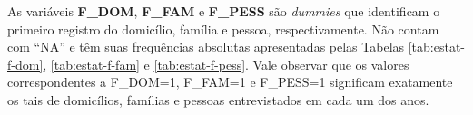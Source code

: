 As variáveis \textbf{F_DOM}, \textbf{F_FAM} e \textbf{F_PESS} são \textit{dummies} que identificam o primeiro registro do domicílio, família e pessoa, respectivamente. Não contam com ``NA'' e têm suas frequências absolutas apresentadas pelas Tabelas \ref{tab:estat-f-dom}, \ref{tab:estat-f-fam} e \ref{tab:estat-f-pess}. Vale observar que os valores correspondentes a F_DOM=1, F_FAM=1 e F_PESS=1 significam exatamente os tais de domicílios, famílias e pessoas entrevistados em cada um dos anos.

\begin{table}[htb]
\centering

\end{table}

\begin{table}[htb]
\centering

\end{table}


